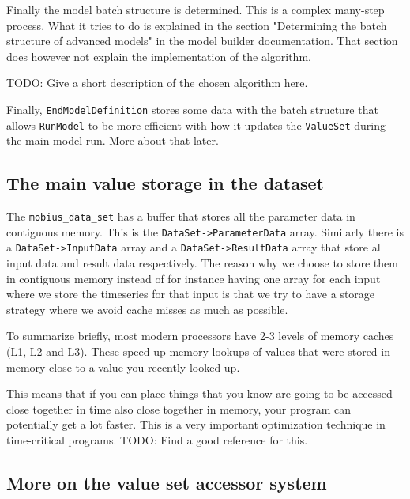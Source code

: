 \documentclass[11pt]{article}
\theoremstyle{definition}
\begin{document}
Finally the model batch structure is determined. This is a complex many-step process. What it tries to do is explained in the section "Determining the batch structure of advanced models" in the model builder documentation. That section does however not explain the implementation of the algorithm.

TODO: Give a short description of the chosen algorithm here.

Finally, {\tt EndModelDefinition} stores some data with the batch structure that allows {\tt RunModel} to be more efficient with how it updates the {\tt ValueSet} during the main model run. More about that later.

\subsection{The main value storage in the dataset}

The {\tt mobius\_data\_set} has a buffer that stores all the parameter data in contiguous memory. This is the {\tt DataSet->ParameterData} array. Similarly there is a {\tt DataSet->InputData} array and a {\tt DataSet->ResultData} array that store all input data and result data respectively. The reason why we choose to store them in contiguous memory instead of for instance having one array for each input where we store the timeseries for that input is that we try to have a storage strategy where we avoid cache misses as much as possible.

To summarize briefly, most modern processors have 2-3 levels of memory caches (L1, L2 and L3). These speed up memory lookups of values that were stored in memory close to a value you recently looked up.

This means that if you can place things that you know are going to be accessed close together in time also close together in memory, your program can potentially get a lot faster. This is a very important optimization technique in time-critical programs. TODO: Find a good reference for this.





\subsection{More on the value set accessor system}
\end{document}
